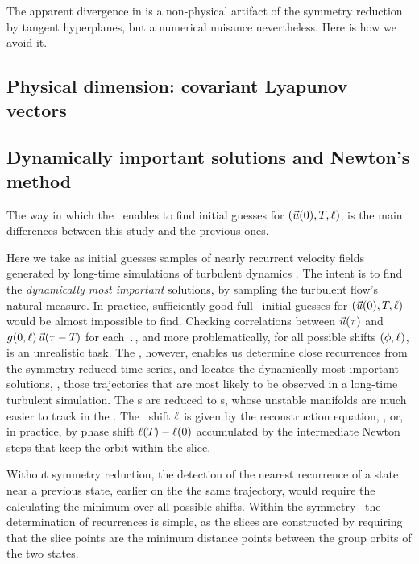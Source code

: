 The apparent divergence in {\phaseVel}  is a
non-physical artifact of the symmetry reduction by tangent hyperplanes,
but a numerical nuisance nevertheless. Here is how we avoid it.

\subsection{Physical dimension: covariant Lyapunov vectors}

\subsection{Dynamically important solutions and Newton's method}
\label{s:reqva}

The way in which the \mslices\ enables to find initial
guesses for $(\vec{u}(0),{T_{}},\ell)$, is the main differences
between this study and the previous ones.

Here we take as initial guesses samples of nearly recurrent velocity
fields generated by long-time simulations of turbulent dynamics
. The intent is to find the {\em dynamically most
important} solutions, by sampling the turbulent flow's natural measure.
In practice, sufficiently good full \statesp\ initial guesses for
$(\vec{u}(0),{T_{}},\ell)$ would be almost impossible to find.
Checking correlations between $\vec{u}(\tau)$ and
$g(0,\ell)\,\vec{u}(\tau-{T_{}})$ for each $\period{}$, and
more problematically, for all possible shifts $(\phi,\ell)$, is an
unrealistic task. The \mslices, however, enables us determine close
recurrences  from the symmetry-reduced time series, and locates the
dynamically most important solutions, \ie, those trajectories that are
most likely to be observed in a long-time turbulent simulation. The \rpo
s are reduced to \po s, whose unstable manifolds are much easier to track
in the \reducedsp. The \rpo\ shift $\ell$ is given by the
reconstruction equation, , or, in practice, by phase
shift $\ell({T_{}})-\ell(0)$ accumulated by the intermediate
Newton steps that keep the orbit within the slice.

Without symmetry reduction, the detection of the nearest recurrence of a
state near a previous state, earlier on the the same trajectory, would
require the calculating the minimum over all possible shifts. Within the
symmetry-\reducedsp\ the determination of recurrences is simple, as the
slices are constructed by requiring that the slice points are the minimum
distance points between the group orbits of the two states.

